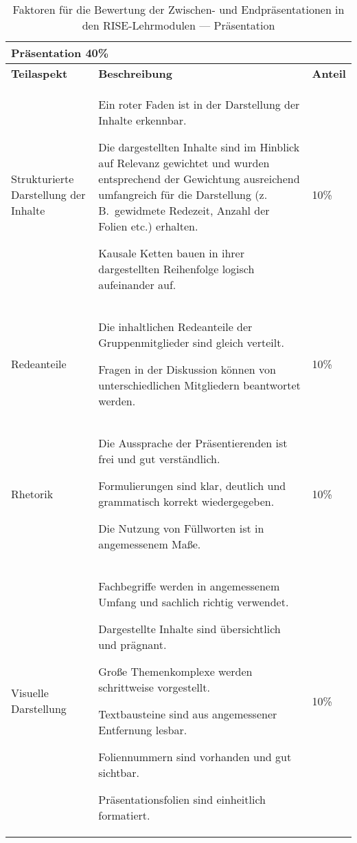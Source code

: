 \clearpage %

\begin{table}[htbp]
\centering
\caption{Faktoren für die Bewertung der Zwischen- und Endpräsentationen in den RISE-Lehrmodulen — Präsentation}
\vspace{0.2cm}
\begin{tabular}{|p{}|p{}|p{}|}
\hline
\multicolumn{3}{|l|}{\textbf{Präsentation \hfill 40\%}}\\ \hline
\textbf{Teilaspekt} & \textbf{Beschreibung} & \textbf{Anteil}\\ \hline

Strukturierte Darstellung der Inhalte &
{\raggedright
Ein roter Faden ist in der Darstellung der Inhalte erkennbar.\par
Die dargestellten Inhalte sind im Hinblick auf Relevanz gewichtet und wurden entsprechend der Gewichtung ausreichend umfangreich für die Darstellung (z.\,B.\ gewidmete Redezeit, Anzahl der Folien etc.) erhalten.\par
Kausale Ketten bauen in ihrer dargestellten Reihenfolge logisch aufeinander auf.\par
}
& 10\% \\ \hline

Redeanteile &
{\raggedright
Die inhaltlichen Redeanteile der Gruppenmitglieder sind gleich verteilt.\par
Fragen in der Diskussion können von unterschiedlichen Mitgliedern beantwortet werden.\par
}
& 10\% \\ \hline

Rhetorik &
{\raggedright
Die Aussprache der Präsentierenden ist frei und gut verständlich.\par
Formulierungen sind klar, deutlich und grammatisch korrekt wiedergegeben.\par
Die Nutzung von Füllworten ist in angemessenem Maße.\par
}
& 10\% \\ \hline

Visuelle Darstellung &
{\raggedright
Fachbegriffe werden in angemessenem Umfang und sachlich richtig verwendet.\par
Dargestellte Inhalte sind übersichtlich und prägnant.\par
Große Themenkomplexe werden schrittweise vorgestellt.\par
Textbausteine sind aus angemessener Entfernung lesbar.\par
Foliennummern sind vorhanden und gut sichtbar.\par
Präsentationsfolien sind einheitlich formatiert.\par
}
& 10\% \\ \hline

\end{tabular}
\end{table}
